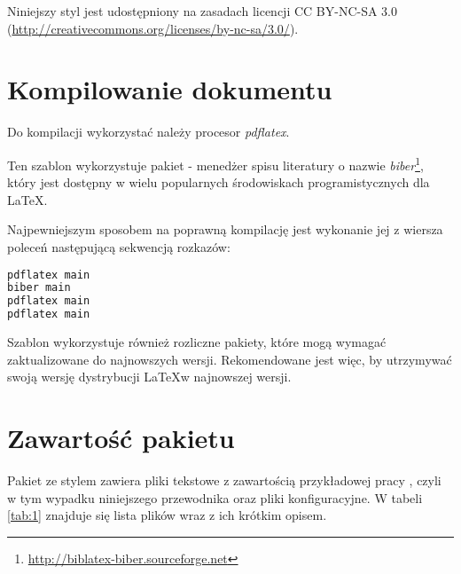 Niniejszy styl jest udostępniony na zasadach licencji CC BY-NC-SA 3.0 ({\url{http://creativecommons.org/licenses/by-nc-sa/3.0/}}).

\section{Kompilowanie dokumentu}

 Do kompilacji wykorzystać należy procesor {\em pdflatex}.
 
 Ten szablon wykorzystuje pakiet - menedżer spisu literatury o nazwie {\em biber}\footnote{ \url{http://biblatex-biber.sourceforge.net}}, który jest dostępny w wielu popularnych środowiskach programistycznych dla \LaTeX.  

Najpewniejszym sposobem na poprawną kompilację jest wykonanie jej z wiersza poleceń następującą sekwencją rozkazów:

\begin{lstlisting}[language=bash, caption=Skrypt kompilujący, label=alg:1]
pdflatex main
biber main
pdflatex main
pdflatex main

\end{lstlisting}

Szablon wykorzystuje również rozliczne pakiety, które mogą wymagać
zaktualizowane do najnowszych wersji. Rekomendowane jest więc, by utrzymywać swoją wersję dystrybucji \LaTeX w najnowszej wersji.

\section{Zawartość pakietu}

Pakiet ze stylem zawiera pliki tekstowe z zawartością przykładowej pracy , czyli w tym wypadku niniejszego przewodnika oraz pliki konfiguracyjne. W tabeli \ref{tab:1} znajduje się lista plików wraz z ich krótkim opisem.

